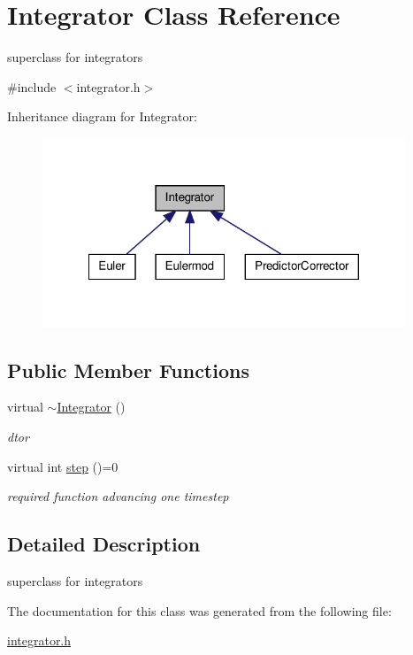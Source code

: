 \hypertarget{classIntegrator}{\section{\-Integrator \-Class \-Reference}
\label{classIntegrator}
}


superclass for integrators  




{\ttfamily \#include $<$integrator.\-h$>$}



\-Inheritance diagram for \-Integrator\-:
\nopagebreak
\begin{figure}[H]
\begin{center}
\leavevmode
\includegraphics[width=308pt]{classIntegrator__inherit__graph}
\end{center}
\end{figure}
\subsection*{\-Public \-Member \-Functions}
\begin{DoxyCompactItemize}
\item 
\hypertarget{classIntegrator_ada0ac381fb6d891c8074fd1ed2102229}{virtual \hyperlink{classIntegrator_ada0ac381fb6d891c8074fd1ed2102229}{$\sim$\-Integrator} ()}\label{classIntegrator_ada0ac381fb6d891c8074fd1ed2102229}

\begin{DoxyCompactList}\small\item\em dtor \end{DoxyCompactList}\item 
\hypertarget{classIntegrator_a453bb8d88d3e35e6212bb43d61ef7253}{virtual int \hyperlink{classIntegrator_a453bb8d88d3e35e6212bb43d61ef7253}{step} ()=0}\label{classIntegrator_a453bb8d88d3e35e6212bb43d61ef7253}

\begin{DoxyCompactList}\small\item\em required function advancing one timestep \end{DoxyCompactList}\end{DoxyCompactItemize}


\subsection{\-Detailed \-Description}
superclass for integrators 

\-The documentation for this class was generated from the following file\-:\begin{DoxyCompactItemize}
\item 
\hyperlink{integrator_8h}{integrator.\-h}\end{DoxyCompactItemize}
